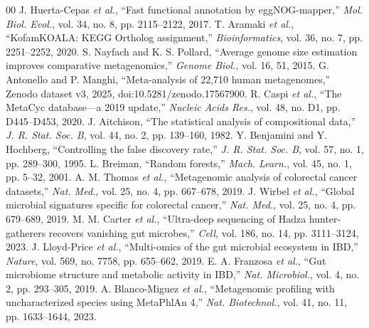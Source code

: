 \documentclass[conference]{IEEEtran}
\begin{document}
{\begin{thebibliography}{00}
 J. Huerta-Cepas \emph{et al.}, ``Fast functional annotation by eggNOG-mapper,'' \emph{Mol. Biol. Evol.}, vol. 34, no. 8, pp. 2115--2122, 2017.
 T. Aramaki \emph{et al.}, ``KofamKOALA: KEGG Ortholog assignment,'' \emph{Bioinformatics}, vol. 36, no. 7, pp. 2251--2252, 2020.
 S. Nayfach and K. S. Pollard, ``Average genome size estimation improves comparative metagenomics,'' \emph{Genome Biol.}, vol. 16, 51, 2015.
 G. Antonello and P. Manghi, ``Meta-analysis of 22,710 human metagenomes,'' Zenodo dataset v3, 2025, doi:10.5281/zenodo.17567900.
 R. Caspi \emph{et al.}, ``The MetaCyc database---a 2019 update,'' \emph{Nucleic Acids Res.}, vol. 48, no. D1, pp. D445--D453, 2020.
 J. Aitchison, ``The statistical analysis of compositional data,'' \emph{J. R. Stat. Soc. B}, vol. 44, no. 2, pp. 139--160, 1982.
 Y. Benjamini and Y. Hochberg, ``Controlling the false discovery rate,'' \emph{J. R. Stat. Soc. B}, vol. 57, no. 1, pp. 289--300, 1995.
 L. Breiman, ``Random forests,'' \emph{Mach. Learn.}, vol. 45, no. 1, pp. 5--32, 2001.
 A. M. Thomas \emph{et al.}, ``Metagenomic analysis of colorectal cancer datasets,'' \emph{Nat. Med.}, vol. 25, no. 4, pp. 667--678, 2019.
 J. Wirbel \emph{et al.}, ``Global microbial signatures specific for colorectal cancer,'' \emph{Nat. Med.}, vol. 25, no. 4, pp. 679--689, 2019.
 M. M. Carter \emph{et al.}, ``Ultra-deep sequencing of Hadza hunter-gatherers recovers vanishing gut microbes,'' \emph{Cell}, vol. 186, no. 14, pp. 3111--3124, 2023.
 J. Lloyd-Price \emph{et al.}, ``Multi-omics of the gut microbial ecosystem in IBD,'' \emph{Nature}, vol. 569, no. 7758, pp. 655--662, 2019.
 E. A. Franzosa \emph{et al.}, ``Gut microbiome structure and metabolic activity in IBD,'' \emph{Nat. Microbiol.}, vol. 4, no. 2, pp. 293--305, 2019.
 A. Blanco-Miguez \emph{et al.}, ``Metagenomic profiling with uncharacterized species using MetaPhlAn 4,'' \emph{Nat. Biotechnol.}, vol. 41, no. 11, pp. 1633--1644, 2023.
\end{thebibliography}}
\end{document}
